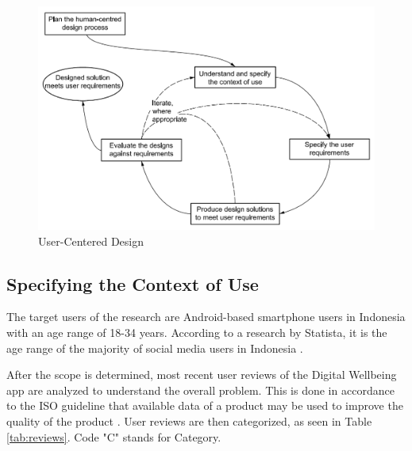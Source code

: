 \documentclass[conference]{IEEEtran}
\begin{document}
\begin{figure}[htbp]
  \centerline{\includegraphics[width=0.9\linewidth]{ucd-figure.png}}
  \caption{User-Centered Design \cite{iso9241-210:2010}} \label{fig:ucd}
\end{figure}

\subsection{Specifying the Context of Use}

The target users of the research are Android-based smartphone users in Indonesia with an age range of 18-34 years. According to a research by Statista, it is the age range of the majority of social media users in Indonesia \cite{mediasosial2020}.

After the scope is determined, most recent user reviews of the Digital Wellbeing app are analyzed to understand the overall problem. This is done in accordance to the ISO guideline that available data of a product may be used to improve the quality of the product \cite{iso9241-210:2010}. User reviews are then categorized, as seen in Table \ref{tab:reviews}. Code "C" stands for Category.
\end{document}
